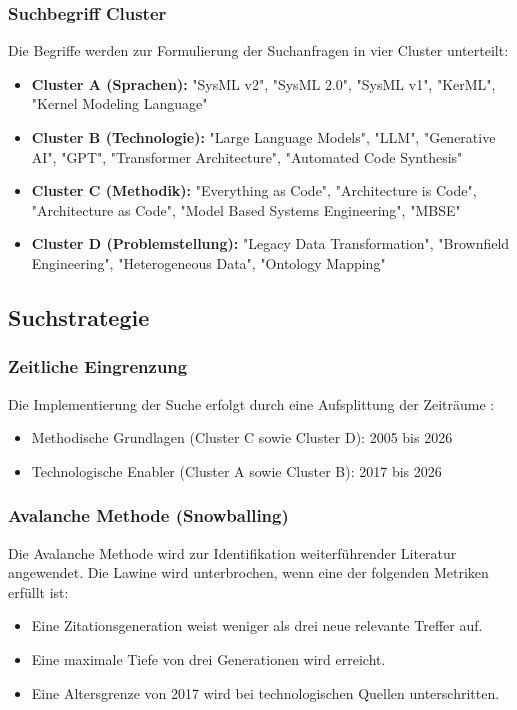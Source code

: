 \subsubsection{Suchbegriff Cluster}

Die Begriffe werden zur Formulierung der Suchanfragen in vier Cluster unterteilt:
\begin{itemize}
    \item \textbf{Cluster A (Sprachen):} "SysML v2", "SysML 2.0", "SysML v1", "KerML", "Kernel Modeling Language"
    \item \textbf{Cluster B (Technologie):} "Large Language Models", "LLM", "Generative AI", "GPT", "Transformer Architecture", "Automated Code Synthesis"
    \item \textbf{Cluster C (Methodik):} "Everything as Code", "Architecture is Code", "Architecture as Code", "Model Based Systems Engineering", "MBSE"
    \item \textbf{Cluster D (Problemstellung):} "Legacy Data Transformation", "Brownfield Engineering", "Heterogeneous Data", "Ontology Mapping"
\end{itemize}

\subsection{Suchstrategie}

\subsubsection{Zeitliche Eingrenzung}

Die Implementierung der Suche erfolgt durch eine Aufsplittung der Zeiträume \cite{Higgins.2019}:
\begin{itemize}
    \item Methodische Grundlagen (Cluster C sowie Cluster D): 2005 bis 2026
    \item Technologische Enabler (Cluster A sowie Cluster B): 2017 bis 2026
\end{itemize}

\subsubsection{Avalanche Methode (Snowballing)}

Die Avalanche Methode wird zur Identifikation weiterführender Literatur angewendet. Die Lawine wird unterbrochen, wenn eine der folgenden Metriken erfüllt ist:
\begin{itemize}
    \item Eine Zitationsgeneration weist weniger als drei neue relevante Treffer auf.
    \item Eine maximale Tiefe von drei Generationen wird erreicht.
    \item Eine Altersgrenze von 2017 wird bei technologischen Quellen unterschritten.
\end{itemize}

